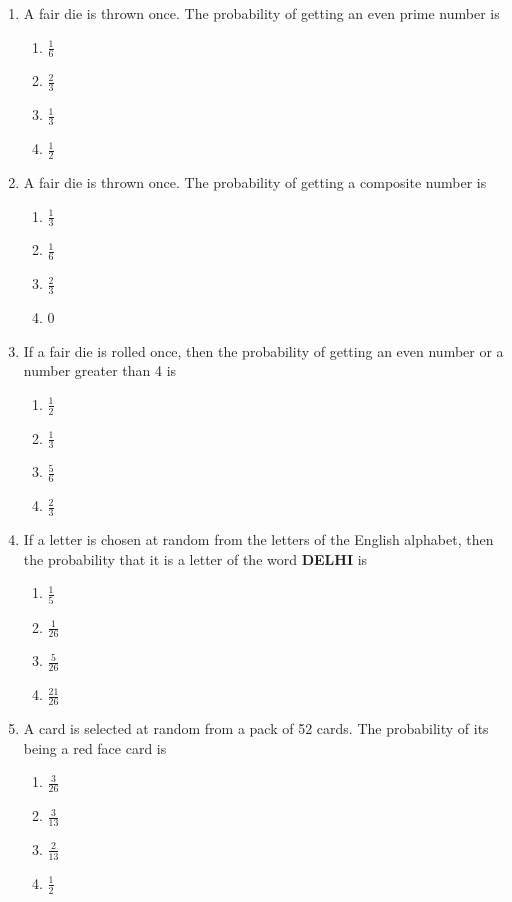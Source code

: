 \documentclass[a4paper, 12pt]{article}
\begin{document}
\begin{multicols}{2}
\begin{enumerate}
		\item A fair die is thrown once. The probability of getting an even prime number is
		\begin{enumerate}
			\item $\frac{1}{6}$
			\item $\frac{2}{3}$
			\item $\frac{1}{3}$
			\item $\frac{1}{2}$
		\end{enumerate}
		
		\item A fair die is thrown once. The probability of getting a composite number is
		\begin{enumerate}
			\item $\frac{1}{3}$
			\item $\frac{1}{6}$
			\item $\frac{2}{3}$
			\item 0
		\end{enumerate}
		
		\item If a fair die is rolled once, then the probability of getting an even number or a number greater than 4 is
		\begin{enumerate}
			\item $\frac{1}{2}$
			\item $\frac{1}{3}$
			\item $\frac{5}{6}$
			\item $\frac{2}{3}$
		\end{enumerate}
		
		\item If a letter is chosen at random from the letters of the English alphabet, then the probability that it is a letter of the word \textbf{DELHI} is
		\begin{enumerate}
			\item $\frac{1}{5}$
			\item $\frac{1}{26}$
			\item $\frac{5}{26}$
			\item $\frac{21}{26}$
		\end{enumerate}
		
		\item A card is selected at random from a pack of 52 cards. The probability of its being a red face card is
		\begin{enumerate}
			\item $\frac{3}{26}$
			\item $\frac{3}{13}$
			\item $\frac{2}{13}$
			\item $\frac{1}{2}$
		\end{enumerate}
	\end{enumerate}
	

\end{multicols}
\end{document}
